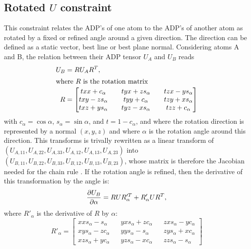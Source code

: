 \documentclass[pdf]{iucr}
\begin{document}
\subsection{Rotated $U$ constraint}
This constraint relates the ADP's of one atom to the ADP's of another atom as rotated by a fixed or refined angle around a given direction. The direction can be defined as a static vector, best line or best plane normal. Considering atoms A and B, the relation between their ADP tensor $U_A$ and $U_B$ reads
\begin{align}
U_{B} &= RU_{A}R^{T}, \\
\shortintertext{where $R$ is the rotation matrix}
R &=
  \begin{bmatrix} 
    txx + c_\alpha && tyx + zs_\alpha && tzx - ys_\alpha \\
    txy - zs_\alpha && tyy + c_\alpha && tzy + xs_\alpha \\
    txz + ys_\alpha && tyz - xs_\alpha && tzz + c_\alpha \\
  \end{bmatrix}
  \label{eqn:rotmat}
\end{align}
with $c_\alpha=\cos\alpha$, $s_\alpha=\sin\alpha$, and $t=1-c_\alpha$, and where the rotation direction is represented by a normal $(x,y,z)$ and where $\alpha$ is the rotation angle around this direction. This transforms is trivally rewritten as a linear transform of $(U_{A,11}, U_{A,22}, U_{A,33}, U_{A,12}, U_{A,13}, U_{A,23})$ into $(U_{B,11}, U_{B,22}, U_{B,33}, U_{B,12}, U_{B,13}, U_{B,23})$, whose matrix is therefore the Jacobian needed for the chain rule . If the rotation angle is refined, then the derivative of this transformation by the angle is:
\begin{equation}
\frac{\partial U_{B}}{\partial \alpha} = RUR_\alpha^{\prime T} + R'_\alpha U R^{T},
\end{equation}
where $R'_\alpha$ is the derivative of $R$ by $\alpha$:
\begin{equation}
R'_\alpha = 
  \begin{bmatrix} 
    xx s_\alpha -  s_\alpha && yx s_\alpha + z c_\alpha && zx s_\alpha - y c_\alpha \\
    xy s_\alpha - z c_\alpha && yy s_\alpha -  s_\alpha && zy s_\alpha + x c_\alpha \\
    xz s_\alpha + y c_\alpha && yz s_\alpha - x c_\alpha && zz s_\alpha - s_\alpha
  \end{bmatrix}
  \label{eqn:rotmatdev}
\end{equation}
\end{document}
